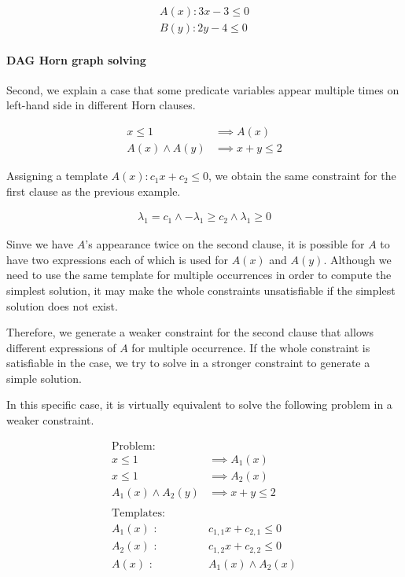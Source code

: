 \documentclass[a4paper,12pt]{article}
\begin{document}
\begin{align*}
A(x) : 3 x - 3 \leq 0 \\
B(y) : 2 y - 4 \leq 0
\end{align*}

\paragraph {DAG Horn graph solving}
Second, we explain a case that some predicate variables appear
multiple times on left-hand side in different Horn clauses.

\begin{align*}
x \leq 1 & \implies A(x) \\
A(x) \wedge A(y) & \implies x+y \leq 2
\end{align*}

Assigning a template
$A(x) : c_1 x + c_2 \leq 0$, we obtain the same
constraint for the first clause as the previous example.

\begin{align} \label{eq:constr1}
\lambda_1 = c_1 \wedge - \lambda_1 \geq c_2 \wedge \lambda_1 \geq 0
\end{align}

Sinve we have $A$'s appearance twice on the second clause,
it is possible for $A$ to have two expressions each of which is used
for $A(x)$ and $A(y)$. Although we need to use the same template for
multiple occurrences in order to compute the simplest solution,
it may make the whole constraints unsatisfiable if the simplest
solution does not exist.

Therefore, we generate a weaker constraint for the second clause that
allows different expressions of $A$ for multiple occurrence. If the
whole constraint is satisfiable in the case, we try to solve in a
stronger constraint to generate a simple solution.

In this specific case, it is virtually equivalent to solve the
following problem in a weaker constraint.

\begin{align*}
\text{Problem:} \\
x \leq 1 & \implies A_1(x) \\
x \leq 1 & \implies A_2(x) \\
A_1(x) \wedge A_2(y) & \implies x+y \leq 2 \\
\\
\text{Templates:} \\
A_1(x) \text{ : } & c_{1,1} x + c_{2,1} \leq 0 \\
A_2(x) \text{ : } & c_{1,2} x + c_{2,2} \leq 0 \\
A(x) \text{ : } & A_1(x) \wedge A_2(x) \\
\end{align*}
\end{document}
